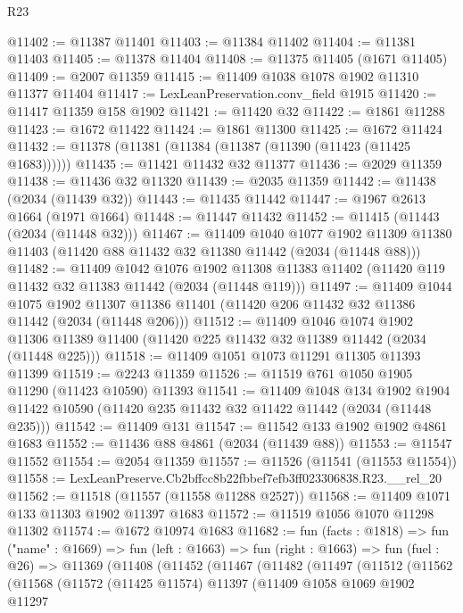 \begin{lexlean}{R23}
\begin{coremodule}
@11402 := @11387 @11401
@11403 := @11384 @11402
@11404 := @11381 @11403
@11405 := @11378 @11404
@11408 := @11375 @11405 (@1671 @11405)
@11409 := @2007 @11359
@11415 := @11409 @1038 @1078 @1902 @11310 @11377 @11404
@11417 := LexLeanPreservation.conv_field @1915
@11420 := @11417 @11359 @158 @1902
@11421 := @11420 @32
@11422 := @1861 @11288
@11423 := @1672 @11422
@11424 := @1861 @11300
@11425 := @1672 @11424
@11432 := @11378 (@11381 (@11384 (@11387 (@11390 (@11423 (@11425 @1683))))))
@11435 := @11421 @11432 @32 @11377
@11436 := @2029 @11359
@11438 := @11436 @32 @11320
@11439 := @2035 @11359
@11442 := @11438 (@2034 (@11439 @32))
@11443 := @11435 @11442
@11447 := @1967 @2613 @1664 (@1971 @1664)
@11448 := @11447 @11432
@11452 := @11415 (@11443 (@2034 (@11448 @32)))
@11467 := @11409
    @1040
    @1077
    @1902
    @11309
    @11380
    @11403
    (@11420 @88 @11432 @32 @11380 @11442 (@2034 (@11448 @88)))
@11482 := @11409
    @1042
    @1076
    @1902
    @11308
    @11383
    @11402
    (@11420 @119 @11432 @32 @11383 @11442 (@2034 (@11448 @119)))
@11497 := @11409
    @1044
    @1075
    @1902
    @11307
    @11386
    @11401
    (@11420 @206 @11432 @32 @11386 @11442 (@2034 (@11448 @206)))
@11512 := @11409
    @1046
    @1074
    @1902
    @11306
    @11389
    @11400
    (@11420 @225 @11432 @32 @11389 @11442 (@2034 (@11448 @225)))
@11518 := @11409 @1051 @1073 @11291 @11305 @11393 @11399
@11519 := @2243 @11359
@11526 := @11519 @761 @1050 @1905 @11290 (@11423 @10590) @11393
@11541 := @11409
    @1048
    @134
    @1902
    @1904
    @11422
    @10590
    (@11420 @235 @11432 @32 @11422 @11442 (@2034 (@11448 @235)))
@11542 := @11409 @131
@11547 := @11542 @133 @1902 @1902 @4861 @1683
@11552 := @11436 @88 @4861 (@2034 (@11439 @88))
@11553 := @11547 @11552
@11554 := @2054 @11359
@11557 := @11526 (@11541 (@11553 @11554))
@11558 := LexLeanPreserve.Cb2bffcc8b22fbbef7efb3ff023306838.R23.__rel_20
@11562 := @11518 (@11557 (@11558 @11288 @2527))
@11568 := @11409 @1071 @133 @11303 @1902 @11397 @1683
@11572 := @11519 @1056 @1070 @11298 @11302
@11574 := @1672 @10974 @1683
@11682 := fun (facts : @1818) =>
  fun ("name" : @1669) =>
  fun (left : @1663) =>
  fun (right : @1663) =>
  fun (fuel : @26) =>
  @11369
    (@11408
      (@11452
        (@11467
          (@11482
            (@11497
              (@11512
                (@11562
                  (@11568
                    (@11572
                      (@11425 @11574)
                      @11397
                      (@11409
                        @1058
                        @1069
                        @1902
                        @11297

\end{coremodule}
\end{lexlean}
